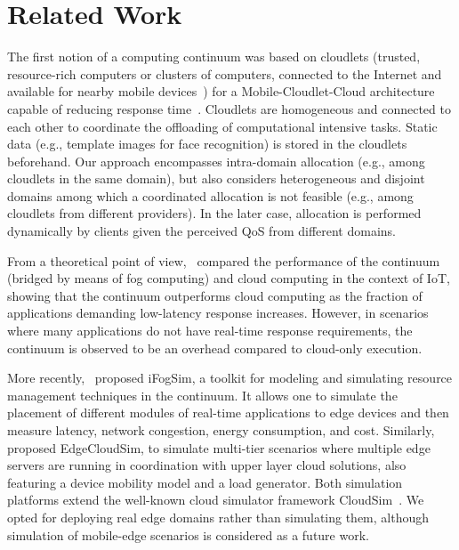 \section{Related Work}
\label{sec:related}

The first notion of a computing continuum was based on cloudlets (trusted, resource-rich computers or clusters of computers, connected to the Internet and available for nearby mobile devices~\cite{Satyanarayanan09cloudlets}) for a Mobile-Cloudlet-Cloud architecture capable of reducing response time~\cite{Soyata:2012}. Cloudlets are homogeneous and connected to each other to coordinate the offloading of computational intensive tasks. Static data (e.g., template images for face recognition) is stored in the cloudlets beforehand. Our approach encompasses intra-domain allocation (e.g., among cloudlets in the same domain), but also considers heterogeneous and disjoint domains among which a coordinated allocation is not feasible (e.g., among cloudlets from different providers). In the later case, allocation is performed dynamically by clients given the perceived QoS from different domains.

From a theoretical point of view,~\cite{sarkar2015assessment} compared the performance of the continuum (bridged by means of fog computing) and cloud computing in the context of IoT, showing that the continuum outperforms cloud computing as the fraction of applications demanding low-latency response increases. However, in scenarios where many applications do not have real-time response requirements, the continuum is observed to be an overhead compared to cloud-only execution.

More recently,~\cite{GuptaIfogSim17} proposed iFogSim, a toolkit for modeling and simulating resource management techniques in the continuum. It allows one to simulate the placement of different modules of real-time applications to edge devices and then measure latency, network congestion, energy consumption, and cost. Similarly,~\cite{SonmezEgdeCloudSim17} proposed EdgeCloudSim, to simulate multi-tier scenarios where multiple edge servers are running in coordination with upper layer cloud solutions, also featuring a device mobility model and a load generator. Both simulation platforms extend the well-known cloud simulator framework CloudSim~\cite{calheiros2011cloudsim}. We opted for deploying real edge domains rather than simulating them, although simulation of mobile-edge scenarios is considered as a future work.

